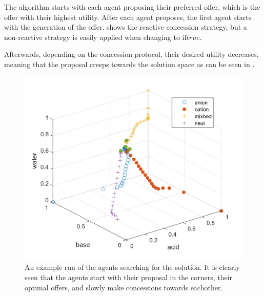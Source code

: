 The algorithm starts with each agent proposing their preferred offer, which is the offer with their highest utility. After each agent proposes, the first agent starts with the generation of the offer.  shows the reactive concession strategy, but a non-reactive strategy is easily applied when changing  to $\text{if} true$.

Afterwards, depending on the concession protocol, their desired utility decreases, meaning that the proposal creeps towards the solution space as can be seen in . 
\begin{figure}[h]
	\centering
	\includegraphics[width=0.7\linewidth]{img/searchforsolution}
	\caption{An example run of the agents searching for the solution. It is clearly seen that the agents start with their proposal in the corners, their optimal offers, and slowly make concessions towards eachother.}
	\label{fig:searchforsolution}
\end{figure}

